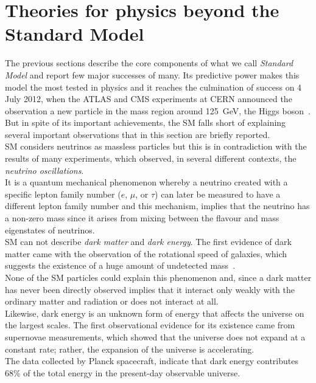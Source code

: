\newpage
\section{Theories for physics beyond the Standard Model}
\label{sec:bsm}
The previous sections describe the core components of what we call \textit{Standard Model} and report few major successes of many. 
Its predictive power makes this model the most tested in physics and it reaches the culmination of success on 4 July 2012, when
the ATLAS and CMS experiments at CERN announced the observation a new particle in the mass region around 125~GeV, the
Higgs boson~\cite{higgsDiscovery}. \\
But in spite of its important achievements, the SM falls short of explaining several important observations that in this section
are briefly reported.
\vspace{\baselineskip}
\\SM considers neutrinos as massless particles but this is in contradiction with the results of many experiments, which observed,
in several different contexts, the \textit{neutrino oscillations}. \\
It is a quantum mechanical phenomenon whereby a neutrino created with a specific lepton family number ($e$, $\mu$, or $\tau$) 
can later be measured to have a different lepton family number and this mechanism, implies that the neutrino has a non-zero mass 
since it arises from mixing between the flavour and mass eigenstates of neutrinos. 
\vspace{\baselineskip}
\\SM can not describe \textit{dark matter} and \textit{dark energy}. The first evidence of dark matter came with the observation of 
the rotational speed of galaxies, which suggests the existence of a huge amount of undetected mass~\cite{zwicky}.\\
None of the SM particles could explain this phenomenon and, since a dark matter has never been directly observed implies that
it interact only weakly with the ordinary matter and radiation or does not interact at all.\\
Likewise, dark energy is an unknown form of energy that affects the universe on the largest scales.
The first observational evidence for its existence came from supernovae measurements, which showed that the universe does 
not expand at a constant rate; rather, the expansion of the universe is accelerating.\\
The data collected by Planck spacecraft, indicate that dark energy contributes  68\% of the total energy in the present-day observable universe. 
